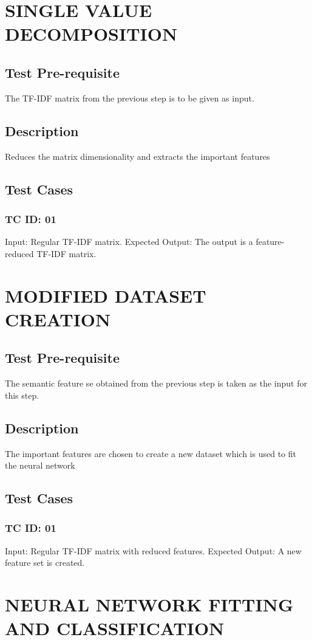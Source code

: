 \section{SINGLE VALUE DECOMPOSITION}
\subsection{Test Pre-requisite}
The TF-IDF matrix from the previous step is to be given as input. 
\subsection{Description}
Reduces the matrix dimensionality and extracts the important features
\subsection{Test Cases}
\subsubsection{TC ID: 01}
Input: Regular TF-IDF matrix.
Expected Output: The output is a feature-reduced TF-IDF matrix.

\section{MODIFIED DATASET CREATION}
\subsection{Test Pre-requisite}
The semantic feature se obtained from the previous step is taken as the input for this step.
\subsection{Description}
The important features are chosen to create a new dataset which is used to fit the neural network
\subsection{Test Cases} 
\subsubsection{TC ID: 01}
Input: Regular TF-IDF matrix with reduced features.
Expected Output: A new feature set is created.

\section{NEURAL NETWORK FITTING AND CLASSIFICATION}
